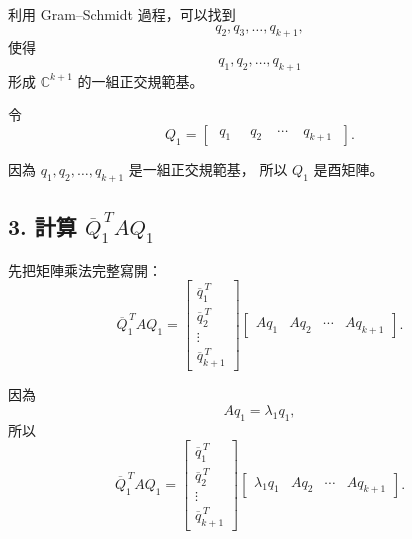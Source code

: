 \documentclass[12pt,a4paper]{article}
\begin{document}
利用 Gram--Schmidt 過程，可以找到
\[
    q_2,q_3,\ldots,q_{k+1},
\]
使得
\[
    q_1,q_2,\ldots,q_{k+1}
\]
形成 $\mathbb{C}^{k+1}$ 的一組正交規範基。

令
\[
    Q_1=
    \left[
        \begin{array}{cccc}
            \;q_1\; & \;q_2\; & \cdots & \;q_{k+1}\;
        \end{array}
        \right].
\]

因為 $q_1,q_2,\ldots,q_{k+1}$ 是一組正交規範基，
所以 $Q_1$ 是酉矩陣。

\subsection*{3. 計算 $\overline{Q}_1^{\,T}AQ_1$}

先把矩陣乘法完整寫開：
\[
    \overline{Q}_1^{\,T}AQ_1
    =
    \left[
        \begin{array}{c}
            \overline{q}_1^{\,T} \\[3pt]
            \overline{q}_2^{\,T} \\[3pt]
            \vdots               \\[3pt]
            \overline{q}_{k+1}^{\,T}
        \end{array}
        \right]
    \left[
        \begin{array}{cccc}
            Aq_1 & Aq_2 & \cdots & Aq_{k+1}
        \end{array}
        \right].
\]

因為
\[
    Aq_1=\lambda_1q_1,
\]
所以
\[
    \overline{Q}_1^{\,T}AQ_1
    =
    \left[
        \begin{array}{c}
            \overline{q}_1^{\,T} \\[3pt]
            \overline{q}_2^{\,T} \\[3pt]
            \vdots               \\[3pt]
            \overline{q}_{k+1}^{\,T}
        \end{array}
        \right]
    \left[
        \begin{array}{cccc}
            \lambda_1q_1 & Aq_2 & \cdots & Aq_{k+1}
        \end{array}
        \right].
\]
\end{document}
